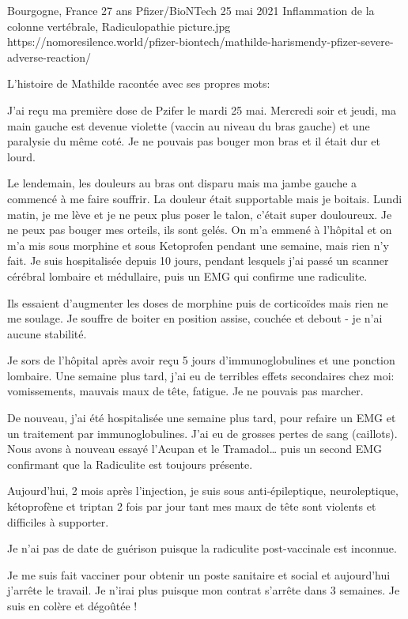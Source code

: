 {Bourgogne, France}
{27 ans}
{Pfizer/BioNTech}
{25 mai 2021}
{Inflammation de la colonne vertébrale, Radiculopathie}
{picture.jpg}
{https://nomoresilence.world/pfizer-biontech/mathilde-harismendy-pfizer-severe-adverse-reaction/}
{

L'histoire de Mathilde racontée avec ses propres mots:

J'ai reçu ma première dose de Pzifer le mardi 25 mai. Mercredi soir et jeudi, ma
main gauche est devenue violette (vaccin au niveau du bras gauche) et une
paralysie du même coté. Je ne pouvais pas bouger mon bras et il était dur et
lourd.

Le lendemain, les douleurs au bras ont disparu mais ma jambe gauche a commencé à
me faire souffrir. La douleur était supportable mais je boitais. Lundi matin, je
me lève et je ne peux plus poser le talon, c'était super douloureux. Je ne peux
pas bouger mes orteils, ils sont gelés. On m'a emmené à l'hôpital et on m'a mis
sous morphine et sous Ketoprofen pendant une semaine, mais rien n'y fait. Je
suis hospitalisée depuis 10 jours, pendant lesquels j'ai passé un scanner
cérébral lombaire et médullaire, puis un EMG qui confirme une radiculite.

Ils essaient d'augmenter les doses de morphine puis de corticoïdes mais rien ne
me soulage. Je souffre de boiter en position assise, couchée et debout - je n'ai
aucune stabilité.

Je sors de l'hôpital après avoir reçu 5 jours d'immunoglobulines et une ponction
lombaire. Une semaine plus tard, j'ai eu de terribles effets secondaires chez
moi: vomissements, mauvais maux de tête, fatigue. Je ne pouvais pas marcher.

De nouveau, j'ai été hospitalisée une semaine plus tard, pour refaire un EMG et
un traitement par immunoglobulines. J'ai eu de grosses pertes de sang
(caillots). Nous avons à nouveau essayé l'Acupan et le Tramadol… puis un second
EMG confirmant que la Radiculite est toujours présente.

Aujourd'hui, 2 mois après l'injection, je suis sous anti-épileptique,
neuroleptique, kétoprofène et triptan 2 fois par jour tant mes maux de tête sont
violents et difficiles à supporter.

Je n'ai pas de date de guérison puisque la radiculite post-vaccinale est
inconnue.

Je me suis fait vacciner pour obtenir un poste sanitaire et social et
aujourd'hui j'arrête le travail. Je n'irai plus puisque mon contrat s'arrête
dans 3 semaines. Je suis en colère et dégoûtée !

}

